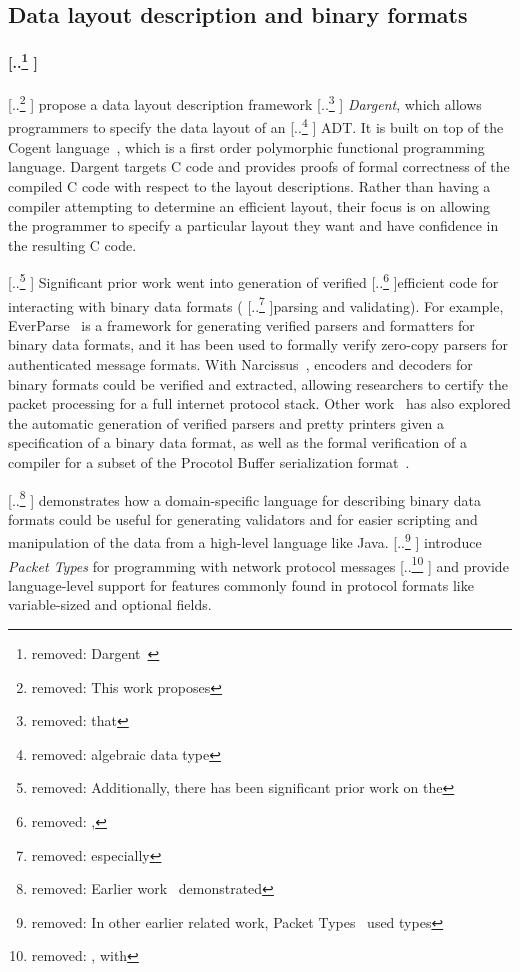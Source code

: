 \documentclass[acmsmall,review,anonymous]{acmart}\settopmatter{printfolios=true,printccs=false,printacmref=false}
\providecommand{\DIFaddtex}[1]{{\protect\color{blue} \sf #1}} %
\providecommand{\DIFdeltex}[1]{{\protect\color{red} [..\footnote{removed: #1} ]}} %
\providecommand{\DIFaddbegin}{} %
\providecommand{\DIFaddend}{} %
\providecommand{\DIFdelbegin}{} %
\providecommand{\DIFdelend}{} %
\providecommand{\DIFadd}[1]{\texorpdfstring{\DIFaddtex{#1}}{#1}} %
\providecommand{\DIFdel}[1]{\texorpdfstring{\DIFdeltex{#1}}{}} %
\newcommand{\DIFscaledelfig}{0.5}
\newlength{\DIFdelgraphicswidth} %
\newlength{\DIFdelgraphicsheight} %
\newcommand{\DIFaddincludegraphics}[2][]{{\color{blue}\fbox{\DIFOincludegraphics[#1]{#2}}}} %
\newcommand{\DIFdelincludegraphics}[2][]{%
\sbox{\DIFdelgraphicsbox}{\DIFOincludegraphics[#1]{#2}}%
\settoboxwidth{\DIFdelgraphicswidth}{\DIFdelgraphicsbox} %
\settoboxtotalheight{\DIFdelgraphicsheight}{\DIFdelgraphicsbox} %
\scalebox{\DIFscaledelfig}{%
\parbox[b]{\DIFdelgraphicswidth}{\usebox{\DIFdelgraphicsbox}\\[-\baselineskip] \rule{\DIFdelgraphicswidth}{0em}}\llap{\resizebox{\DIFdelgraphicswidth}{\DIFdelgraphicsheight}{%
\setlength{\unitlength}{\DIFdelgraphicswidth}%
\begin{picture}(1,1)%
\thicklines\linethickness{2pt} %
{\color[rgb]{1,0,0}\put(0,0){\framebox(1,1){}}}%
{\color[rgb]{1,0,0}\put(0,0){\line( 1,1){1}}}%
{\color[rgb]{1,0,0}\put(0,1){\line(1,-1){1}}}%
\end{picture}%
}\hspace*{3pt}}} %
} %
\DeclareRobustCommand{\DIFaddbegin}{\DIFOaddbegin \let\includegraphics\DIFaddincludegraphics} %
\DeclareRobustCommand{\DIFaddend}{\DIFOaddend \let\includegraphics\DIFOincludegraphics} %
\DeclareRobustCommand{\DIFdelbegin}{\DIFOdelbegin \let\includegraphics\DIFdelincludegraphics} %
\DeclareRobustCommand{\DIFdelend}{\DIFOaddend \let\includegraphics\DIFOincludegraphics} %
\begin{document}
\subsection{Data layout description and binary formats}

\DIFdelbegin \paragraph{\DIFdel{Dargent~\cite{Dargent}}} %
\addtocounter{paragraph}{-1}%
\DIFdel{This work proposes }\DIFdelend \DIFaddbegin \DIFadd{\citet{Dargent} propose }\DIFaddend a data layout description framework \DIFdelbegin \DIFdel{that }\DIFdelend \DIFaddbegin \DIFadd{\emph{Dargent}, which }\DIFaddend allows programmers to specify the data layout of an \DIFdelbegin \DIFdel{algebraic data type}\DIFdelend \DIFaddbegin \DIFadd{ADT}\DIFaddend . It is built on top of the Cogent language~\cite{o2016cogent}, which is a first order polymorphic functional programming language. Dargent targets C code and provides proofs of formal correctness of the compiled C code with respect to the layout descriptions. Rather than having a compiler attempting to determine an efficient layout, their focus is on allowing the programmer to specify a particular layout they want and have confidence in the resulting C code.






\DIFdelbegin \DIFdel{Additionally, there has been significant prior work on the }\DIFdelend \DIFaddbegin \DIFadd{Significant prior work went into }\DIFaddend generation of verified \DIFdelbegin \DIFdel{, }\DIFdelend efficient code for interacting with binary data formats (\DIFdelbegin \DIFdel{especially }\DIFdelend parsing and validating). For example, EverParse~\cite{EverParse} is a framework for generating verified parsers and formatters for binary data formats, and it has been used to formally verify zero-copy parsers for authenticated message formats. With Narcissus~\cite{Narcissus}, encoders and decoders for binary formats could be verified and extracted, allowing researchers to certify the packet processing for a full internet protocol stack. Other work~\cite{GenericPacketDescriptions} has also explored the automatic generation of verified parsers and pretty printers given a specification of a binary data format, as well as the formal verification of a compiler for a subset of the Procotol Buffer serialization format~\cite{VPBdeleware}.

\DIFdelbegin \DIFdel{Earlier work~\cite{DataScript} demonstrated }\DIFdelend \DIFaddbegin \DIFadd{\citet{DataScript} demonstrates }\DIFaddend how a domain-specific language for describing binary data formats could be useful for generating validators and for easier scripting and manipulation of the data from a high-level language like Java. \DIFdelbegin \DIFdel{In other earlier related work, Packet Types~\cite{PacketTypes} used types }\DIFdelend \DIFaddbegin \DIFadd{\cite{PacketTypes} introduce \emph{Packet Types} }\DIFaddend for programming with network protocol messages \DIFdelbegin \DIFdel{, with }\DIFdelend \DIFaddbegin \DIFadd{and provide }\DIFaddend language-level support for features commonly found in protocol formats like variable-sized and optional fields.
\end{document}
